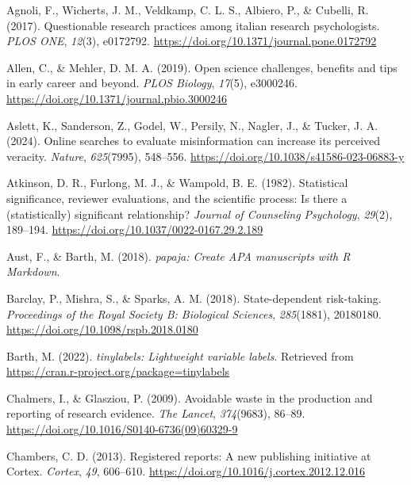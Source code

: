 \documentclass[
  ,man,mask,floatsintext]{apa6}
\newlength{\cslhangindent}
\newlength{\cslentryspacingunit} %
\newenvironment{CSLReferences}[2] %
 {%
  \setlength{\parindent}{0pt}
  \ifodd #1
  \let\oldpar\par
  \def\par{\hangindent=\cslhangindent\oldpar}
  \fi
  \setlength{\parskip}{#2\cslentryspacingunit}
 }%
 {}
\begin{document}
\hypertarget{refs}{}
\begin{CSLReferences}{1}{0}
\leavevmode{}%
Agnoli, F., Wicherts, J. M., Veldkamp, C. L. S., Albiero, P., \& Cubelli, R. (2017). Questionable research practices among italian research psychologists. \emph{PLOS ONE}, \emph{12}(3), e0172792. \url{https://doi.org/10.1371/journal.pone.0172792}

\leavevmode{}%
Allen, C., \& Mehler, D. M. A. (2019). Open science challenges, benefits and tips in early career and beyond. \emph{PLOS Biology}, \emph{17}(5), e3000246. \url{https://doi.org/10.1371/journal.pbio.3000246}

\leavevmode{}%
Aslett, K., Sanderson, Z., Godel, W., Persily, N., Nagler, J., \& Tucker, J. A. (2024). Online searches to evaluate misinformation can increase its perceived veracity. \emph{Nature}, \emph{625}(7995), 548--556. \url{https://doi.org/10.1038/s41586-023-06883-y}

\leavevmode{}%
Atkinson, D. R., Furlong, M. J., \& Wampold, B. E. (1982). Statistical significance, reviewer evaluations, and the scientific process: {Is} there a (statistically) significant relationship? \emph{Journal of Counseling Psychology}, \emph{29}(2), 189--194. \url{https://doi.org/10.1037/0022-0167.29.2.189}

\leavevmode{}%
Aust, F., \& Barth, M. (2018). \emph{{papaja}: {Create APA} manuscripts with {R Markdown}}.

\leavevmode{}%
Barclay, P., Mishra, S., \& Sparks, A. M. (2018). State-dependent risk-taking. \emph{Proceedings of the Royal Society B: Biological Sciences}, \emph{285}(1881), 20180180. \url{https://doi.org/10.1098/rspb.2018.0180}

\leavevmode{}%
Barth, M. (2022). \emph{{tinylabels}: Lightweight variable labels}. Retrieved from \url{https://cran.r-project.org/package=tinylabels}

\leavevmode{}%
Chalmers, I., \& Glasziou, P. (2009). Avoidable waste in the production and reporting of research evidence. \emph{The Lancet}, \emph{374}(9683), 86--89. \url{https://doi.org/10.1016/S0140-6736(09)60329-9}

\leavevmode{}%
Chambers, C. D. (2013). Registered reports: {A} new publishing initiative at {Cortex}. \emph{Cortex}, \emph{49}, 606--610. \url{https://doi.org/10.1016/j.cortex.2012.12.016}


\end{CSLReferences}
\end{document}
